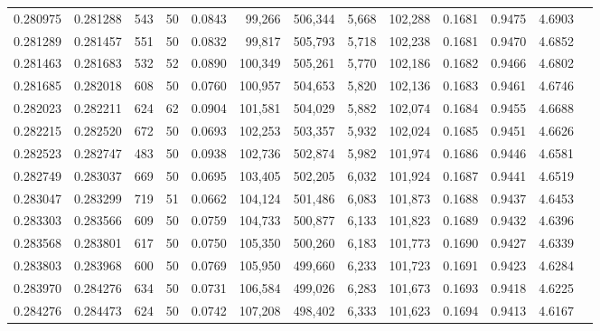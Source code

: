 \begin{tabular}{rrrrrrrrrrrrr}
0.280975 & 0.281288 &   543 &  50 &                                     0.0843 &  99,266 & 506,344 &   5,668 & 102,288 & 0.1681 & 0.9475 & 4.6903 \\
0.281289 & 0.281457 &   551 &  50 &                                     0.0832 &  99,817 & 505,793 &   5,718 & 102,238 & 0.1681 & 0.9470 & 4.6852 \\
0.281463 & 0.281683 &   532 &  52 &                                     0.0890 & 100,349 & 505,261 &   5,770 & 102,186 & 0.1682 & 0.9466 & 4.6802 \\
0.281685 & 0.282018 &   608 &  50 &                                     0.0760 & 100,957 & 504,653 &   5,820 & 102,136 & 0.1683 & 0.9461 & 4.6746 \\
0.282023 & 0.282211 &   624 &  62 &                                     0.0904 & 101,581 & 504,029 &   5,882 & 102,074 & 0.1684 & 0.9455 & 4.6688 \\
0.282215 & 0.282520 &   672 &  50 &                                     0.0693 & 102,253 & 503,357 &   5,932 & 102,024 & 0.1685 & 0.9451 & 4.6626 \\
0.282523 & 0.282747 &   483 &  50 &                                     0.0938 & 102,736 & 502,874 &   5,982 & 101,974 & 0.1686 & 0.9446 & 4.6581 \\
0.282749 & 0.283037 &   669 &  50 &                                     0.0695 & 103,405 & 502,205 &   6,032 & 101,924 & 0.1687 & 0.9441 & 4.6519 \\
0.283047 & 0.283299 &   719 &  51 &                                     0.0662 & 104,124 & 501,486 &   6,083 & 101,873 & 0.1688 & 0.9437 & 4.6453 \\
0.283303 & 0.283566 &   609 &  50 &                                     0.0759 & 104,733 & 500,877 &   6,133 & 101,823 & 0.1689 & 0.9432 & 4.6396 \\
0.283568 & 0.283801 &   617 &  50 &                                     0.0750 & 105,350 & 500,260 &   6,183 & 101,773 & 0.1690 & 0.9427 & 4.6339 \\
0.283803 & 0.283968 &   600 &  50 &                                     0.0769 & 105,950 & 499,660 &   6,233 & 101,723 & 0.1691 & 0.9423 & 4.6284 \\
0.283970 & 0.284276 &   634 &  50 &                                     0.0731 & 106,584 & 499,026 &   6,283 & 101,673 & 0.1693 & 0.9418 & 4.6225 \\
0.284276 & 0.284473 &   624 &  50 &                                     0.0742 & 107,208 & 498,402 &   6,333 & 101,623 & 0.1694 & 0.9413 & 4.6167 \\

\end{tabular}
